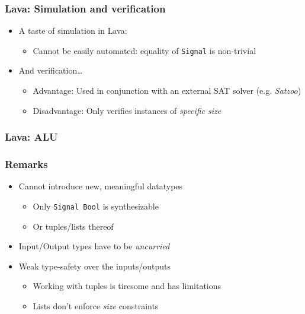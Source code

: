         \begin{frame}
            \frametitle{Lava: Simulation and verification}

            \begin{itemize}
                \item A taste of simulation in Lava:
                    \begin{itemize}
                        \item Cannot be easily automated: equality of \texttt{Signal} is non-trivial
                    \end{itemize}

                \item And verification\ldots
                    \begin{itemize}
                        \item Advantage: Used in conjunction with an external SAT solver (e.g. \emph{Satzoo})
                        \item Disadvantage: Only verifies instances of \emph{specific size}
                    \end{itemize}
            \end{itemize}
        \end{frame}

        \begin{frame}
            \frametitle{Lava: ALU}
        \end{frame}

        \begin{frame}
            \frametitle{Remarks}

            \begin{itemize}
                \item Cannot introduce new, meaningful datatypes
                    \begin{itemize}
                        \item Only \texttt{Signal Bool} is synthesizable
                        \item Or tuples/lists thereof
                    \end{itemize}
                \item Input/Output types have to be \emph{uncurried}
                \item Weak type-safety over the inputs/outputs
                    \begin{itemize}
                        \item Working with tuples is tiresome and has limitations
                        \item Lists don't enforce \emph{size} constraints
                    \end{itemize}
            \end{itemize}
        \end{frame}

